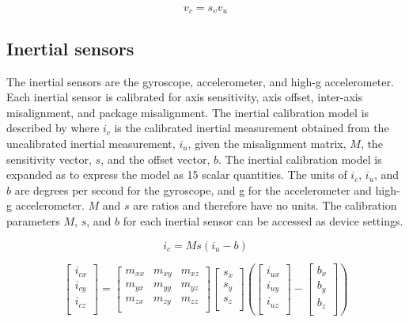 \begin{equation}
\label{eq:batteryVoltmeter}
v_c = s_v v_u
\end{equation}

\subsection{Inertial sensors}
\label{sec:inertialSensor}

The inertial sensors are the gyroscope, accelerometer, and high-g accelerometer.  Each inertial sensor is calibrated for axis sensitivity, axis offset, inter-axis misalignment, and package misalignment.  The inertial calibration model is described by  where $i_c$ is the calibrated inertial measurement obtained from the uncalibrated inertial measurement, $i_u$, given the misalignment matrix, $M$, the sensitivity vector, $s$, and the offset vector, $b$.  The inertial calibration model is expanded as  to express the model as 15 scalar quantities.  The units of $i_c$, $i_u$, and $b$ are degrees per second for the gyroscope, and g for the accelerometer and high-g accelerometer.  $M$ and $s$ are ratios and therefore have no units.  The calibration parameters $M$, $s$, and $b$ for each inertial sensor can be accessed as device settings.

\begin{equation}
\label{eq:inertial}
i_c = M s (i_u - b)
\end{equation}

\begin{equation}
\label{eq:inertialExpanded}
    \begin{bmatrix}
        i_{cx}\\
        i_{cy}\\
        i_{cz}\\
    \end{bmatrix}
    =
    \begin{bmatrix}
        m_{xx} & m_{xy} & m_{xz}\\
        m_{yx} & m_{yy} & m_{yz}\\
        m_{zx} & m_{zy} & m_{zz}\\
    \end{bmatrix}
    \begin{bmatrix}
        s_{x}\\
        s_{y}\\
        s_{z}\\
    \end{bmatrix}
    \left(
    \begin{bmatrix}
        i_{ux}\\
        i_{uy}\\
        i_{uz}\\
    \end{bmatrix}
    -
    \begin{bmatrix}
        b_{x}\\
        b_{y}\\
        b_{z}\\
    \end{bmatrix}
    \right)
\end{equation}

